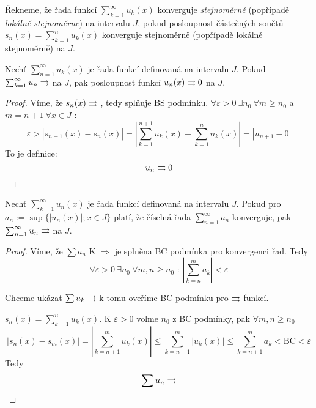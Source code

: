 \begin{definice}
Řekneme, že řada funkcí $\sum_{k=1}^{\infty} u_k (x)$ konverguje \emph{stejnoměrně} (popřípadě \emph{lokálně stejnoměrne}) na intervalu $J$, pokud posloupnost částečných součtů $s_n(x) = \sum_{k=1}^{n} u_k (x)$ konverguje stejnoměrně (popřípadě lokálně stejnoměrně) na $J$.
\end{definice}

\begin{vetal}
Nechť $\sum_{n=1}^{\infty} u_k (x)$ je řada funkcí definovaná na intervalu $J$. Pokud $\sum_{k=1}^{\infty} u_n \rightrightarrows$ na $J$, pak posloupnost funkcí $u_n (x) \rightrightarrows 0$ na $J$.
\end{vetal}
\begin{proof}
Víme, že $s_n(x) \rightrightarrows $ , tedy splňuje BS podmínku. 
$\forall \varepsilon > 0 \ \exists n_0 \ \forall m \geq n_0$ a $ m = n+1 \ \forall x \in J$ :
$$\varepsilon > |s_{n+1}(x) - s_n(x)| = \left| \sum_{k=1}^{n+1} u_k(x) - \sum_{k=1}^{n}u_k(x) \right| = |u_{n+1} - 0|$$
To je definice: $$ u_n \rightrightarrows 0$$
\end{proof}

\begin{vetal}
Nechť $\sum_{k=1}^{\infty} u_n (x)$ je řada funkcí definovaná na intervalu $J$. Pokud pro $a_n := \sup \{ | u_n (x) |; x \in J \}$ platí, že číselná řada $\sum_{n=1}^{\infty} a_n$ konverguje, pak $\sum_{n=1}^{\infty} u_n \rightrightarrows$ na $J$.
\end{vetal}
\begin{proof}
Víme, že $\sum a_n $ K $\Rightarrow $ je splněna BC podmínka pro konvergenci řad.
Tedy 
$$\forall \varepsilon > 0 \ \exists n_0 \ \forall m,n \geq n_0 \textrm{ : } \left| \sum_{k = n}^m a_k \right| < \varepsilon$$

Chceme ukázat $\sum u_k \rightrightarrows$ k tomu oveříme BC podmínku pro $\rightrightarrows$ funkcí.

$s_n(x) = \sum_{k=1}^n u_k(x)$. K $\varepsilon > 0$ volme $n_0$ z BC podmínky, pak $\forall m,n \geq n_0$
$$ | s_n(x) - s_m(x) | = \left| \sum_{k=n+1}^m u_k(x) \right| \leq \sum_{k=n+1}^m |u_k(x)| \leq \sum_{k=n+1}^m a_k < \textrm{BC} < \varepsilon $$
Tedy $$\sum u_n \rightrightarrows $$
\end{proof}

